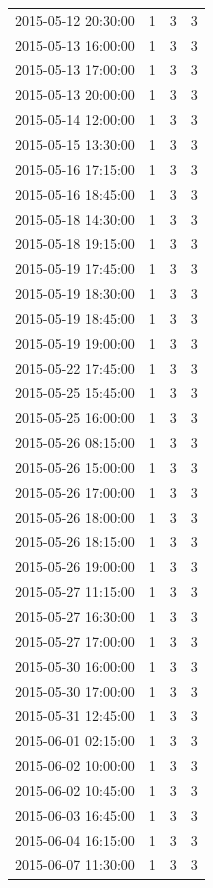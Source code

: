 \begin{tabular}{lrrr}
2015-05-12 20:30:00 & 1 & 3 & 3 \\
2015-05-13 16:00:00 & 1 & 3 & 3 \\
2015-05-13 17:00:00 & 1 & 3 & 3 \\
2015-05-13 20:00:00 & 1 & 3 & 3 \\
2015-05-14 12:00:00 & 1 & 3 & 3 \\
2015-05-15 13:30:00 & 1 & 3 & 3 \\
2015-05-16 17:15:00 & 1 & 3 & 3 \\
2015-05-16 18:45:00 & 1 & 3 & 3 \\
2015-05-18 14:30:00 & 1 & 3 & 3 \\
2015-05-18 19:15:00 & 1 & 3 & 3 \\
2015-05-19 17:45:00 & 1 & 3 & 3 \\
2015-05-19 18:30:00 & 1 & 3 & 3 \\
2015-05-19 18:45:00 & 1 & 3 & 3 \\
2015-05-19 19:00:00 & 1 & 3 & 3 \\
2015-05-22 17:45:00 & 1 & 3 & 3 \\
2015-05-25 15:45:00 & 1 & 3 & 3 \\
2015-05-25 16:00:00 & 1 & 3 & 3 \\
2015-05-26 08:15:00 & 1 & 3 & 3 \\
2015-05-26 15:00:00 & 1 & 3 & 3 \\
2015-05-26 17:00:00 & 1 & 3 & 3 \\
2015-05-26 18:00:00 & 1 & 3 & 3 \\
2015-05-26 18:15:00 & 1 & 3 & 3 \\
2015-05-26 19:00:00 & 1 & 3 & 3 \\
2015-05-27 11:15:00 & 1 & 3 & 3 \\
2015-05-27 16:30:00 & 1 & 3 & 3 \\
2015-05-27 17:00:00 & 1 & 3 & 3 \\
2015-05-30 16:00:00 & 1 & 3 & 3 \\
2015-05-30 17:00:00 & 1 & 3 & 3 \\
2015-05-31 12:45:00 & 1 & 3 & 3 \\
2015-06-01 02:15:00 & 1 & 3 & 3 \\
2015-06-02 10:00:00 & 1 & 3 & 3 \\
2015-06-02 10:45:00 & 1 & 3 & 3 \\
2015-06-03 16:45:00 & 1 & 3 & 3 \\
2015-06-04 16:15:00 & 1 & 3 & 3 \\
2015-06-07 11:30:00 & 1 & 3 & 3 \\

\end{tabular}
